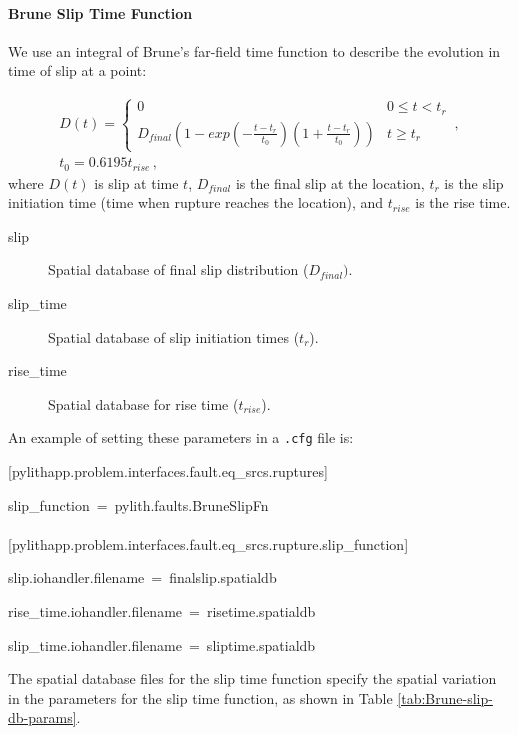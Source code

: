 \paragraph{Brune Slip Time Function}

We use an integral of Brune's far-field time function \cite{Brune:1970}
to describe the evolution in time of slip at a point: 

\begin{gather}
D(t)=\left\{ \begin{array}{cc}
0 & 0\leq t<t_{r}\\
D_{final}\left(1-exp\left(-\frac{t-t_{r}}{t_{0}}\right)\left(1+\frac{t-t_{r}}{t_{0}}\right)\right) & t\ge t_{r}
\end{array}\right.\,,\\
t_{0}=0.6195t_{\mathit{rise}}\,,
\end{gather}
where $D(t)$ is slip at time $t$, $D_{final}$ is the final slip
at the location, $t_{r}$ is the slip initiation time (time when rupture
reaches the location), and $t_{\mathit{rise}}$ is the rise time.
\begin{description}
\item [{slip}] Spatial database of final slip distribution ($D_{final})$.
\item [{slip\_time}] Spatial database of slip initiation times ($t_{r}$).
\item [{rise\_time}] Spatial database for rise time ($t_{\mathit{rise}}$).
\end{description}
An example of setting these parameters in a \texttt{.cfg} file is:
\begin{lyxcode}
{[}pylithapp.problem.interfaces.fault.eq\_srcs.ruptures{]}

slip\_function~=~pylith.faults.BruneSlipFn~\\
~\\
{[}pylithapp.problem.interfaces.fault.eq\_srcs.rupture.slip\_function{]}

slip.iohandler.filename~=~finalslip.spatialdb

rise\_time.iohandler.filename~=~risetime.spatialdb

slip\_time.iohandler.filename~=~sliptime.spatialdb
\end{lyxcode}
The spatial database files for the slip time function specify the
spatial variation in the parameters for the slip time function, as
shown in Table \ref{tab:Brune-slip-db-params}.

